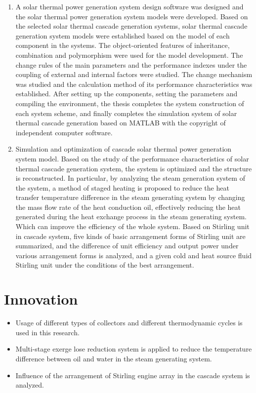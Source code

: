 \begin{enumerate}
  \item A solar thermal power generation system design software was designed and the solar thermal power generation system models were developed. Based on the selected solar thermal cascade generation systems, solar thermal cascade generation system models were established based on the model of each component in the systems. The object-oriented features of inheritance, combination and polymorphism were used for the model development. The change rules of the main parameters and the performance indexes under the coupling of external and internal factors were studied. The change mechanism was studied and the calculation method of its performance characteristics was established. After setting up the components, setting the parameters and compiling the environment, the thesis completes the system construction of each system scheme, and finally completes the simulation system of solar thermal cascade generation based on MATLAB with the copyright of independent computer software. 
  \item Simulation and optimization of cascade solar thermal power generation system model. Based on the study of the performance characteristics of solar thermal cascade generation system, the system is optimized and the structure is reconstructed. In particular, by analyzing the steam generation system of the system, a method of staged heating is proposed to reduce the heat transfer temperature difference in the steam generating system by changing the mass flow rate of the heat conduction oil, effectively reducing the heat generated during the heat exchange process in the steam generating system. Which can improve the efficiency of the whole system. Based on Stirling unit in cascade system, five kinds of basic arrangement forms of Stirling unit are summarized, and the difference of unit efficiency and output power under various arrangement forms is analyzed, and a given cold and heat source fluid Stirling unit under the conditions of the best arrangement.
\end{enumerate}

\section{Innovation}
%
%

\begin{itemize}
  \item Usage of different types of collectors and different thermodynamic cycles is used in this research.
  \item Multi-stage exerge lose reduction system is applied to reduce the temperature difference between oil and water in the steam generating system.
  \item Influence of the arrangement of Stirling engine array in the cascade system is analyzed.
\end{itemize}

